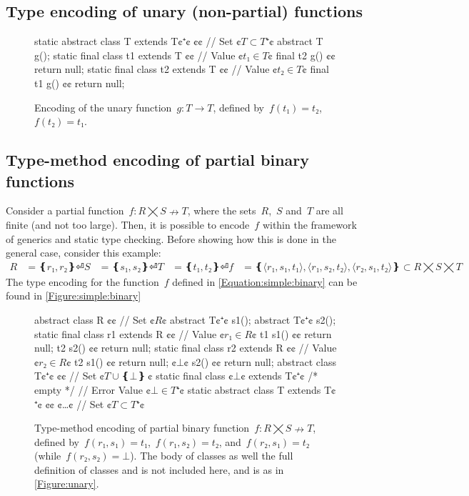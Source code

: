 \subsection{Type encoding of unary (non-partial) functions}
\begin{figure}
  \begin{JAVA}[style=numbered]
static abstract class T extends T¢$⁺$¢ {¢¢ // Set ¢$T⊂T⁺$¢
  abstract T g();
}
static final class t1 extends T {¢¢ // Value ¢$t₁∈T$¢
  final t2 g() {¢¢ return null; }
}
static final class t2 extends T {¢¢ // Value ¢$t₂∈T$¢
  final t1 g() {¢¢ return null; }
}
\end{JAVA}
  \caption{Encoding of the unary function~$g: T→T$,
  defined by~$f(t₁)=t₂$,~$f(t₂)=t₁$.}
  \label{Figure:unary:function}
\end{figure}

\subsection{Type-method encoding of partial binary functions}
Consider a partial function~$f: R⨉S↛T$,
where the sets~$R$,~$S$ and~$T$ are all finite (and not too large).
Then, it is possible to encode~$f$
  within the framework of \Java generics and static type checking.
Before showing how this is done in the general case, consider this example:
\begin{equation}
  \label{Equation:simple:binary}
\begin{split}
  R & = ❴ r₁, r₂❵⏎
  S & = ❴ s₁, s₂❵⏎
  T & = ❴ t₁, t₂❵⏎
  f & = ❴ ⟨r₁, s₁, t₁⟩, ⟨r₁, s₂, t₂⟩, ⟨r₂, s₁, t₂⟩ ❵ ⊂R⨉S⨉T
\end{split}
\end{equation}
The \Java type encoding for the function~$f$ defined in \cref{Equation:simple:binary}
  can be found in \cref{Figure:simple:binary}

\begin{figure}
  \begin{JAVA}[style=numbered]
abstract class R {¢¢ // Set ¢$R$¢
  abstract T¢$⁺$¢ s1();
  abstract T¢$⁺$¢ s2();
  static final class r1 extends R {¢¢ // Value ¢$r₁∈R$¢
    t1 s1() {¢¢ return null; }
    t2 s2() {¢¢ return null; }
  }
  static final class r2 extends R {¢¢ // Value ¢$r₂∈R$¢
    t2 s1() {¢¢ return null; }
    ¢$⊥$¢ s2() {¢¢ return null; }
  }
}
abstract class T¢$⁺$¢ {¢¢ // Set ¢$T∪❴⊥❵~$¢
  static final class ¢$⊥$¢ extends T¢$⁺$¢ { /* empty */ } // Error Value ¢$⊥∈T⁺$¢
  static abstract class T extends T¢$⁺$¢ {¢¢ ¢…¢ } // Set ¢$T⊂T⁺$¢
}
\end{JAVA}
  \caption{Type-method encoding of partial binary function~$f: R⨉S↛T$,
  defined by~$f(r₁,s₁)=t₁$,~$f(r₁,s₂)=t₂$, and~$f(r₂,s₁)=t₂$ (while~$f(r₂, s₂) =⊥$).
  The body of classes  as well the full definition of classes  and  is not included here, and is
    as in \cref{Figure:unary}.}
\end{figure}

